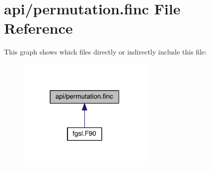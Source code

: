 \hypertarget{permutation_8finc}{\section{api/permutation.finc File Reference}
\label{permutation_8finc}
}
This graph shows which files directly or indirectly include this file\-:
\nopagebreak
\begin{figure}[H]
\begin{center}
\leavevmode
\includegraphics[width=184pt]{permutation_8finc__dep__incl}
\end{center}
\end{figure}
